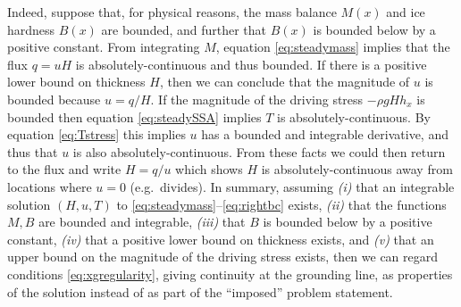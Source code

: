 \documentclass[review,letterpaper]{igs}
\begin{document}
Indeed, suppose that, for physical reasons, the mass balance $M(x)$ and ice hardness $B(x)$ are bounded, and further that $B(x)$ is bounded below by a positive constant.  From integrating $M$, equation \eqref{eq:steadymass} implies that the flux $q=uH$ is absolutely-continuous and thus bounded.  If there is a positive lower bound on thickness $H$, then we can conclude that the magnitude of $u$ is bounded because $u=q/H$.  If the magnitude of the driving stress $-\rho g H h_x$ is bounded then equation \eqref{eq:steadySSA} implies $T$ is absolutely-continuous.  By equation \eqref{eq:Tstress} this implies $u$ has a bounded and integrable derivative, and thus that $u$ is also absolutely-continuous.  From these facts we could then return to the flux and write $H=q/u$ which shows $H$ is absolutely-continuous away from locations where $u=0$ (e.g.~divides).  In summary, assuming \emph{(i)} that an integrable solution $(H,u,T)$ to \eqref{eq:steadymass}--\eqref{eq:rightbc} exists, \emph{(ii)} that the functions $M,B$ are bounded and integrable, \emph{(iii)} that $B$ is bounded below by a positive constant, \emph{(iv)} that a positive lower bound on thickness exists, and \emph{(v)} that an upper bound on the magnitude of the driving stress exists, then we can regard conditions \eqref{eq:xgregularity}, giving continuity at the grounding line, as properties of the solution instead of as part of the ``imposed'' problem statement.
\end{document}
